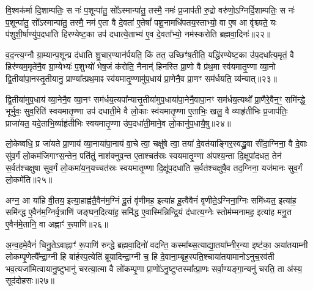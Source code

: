 {\anuvakamend[{ओष॑धयः॒ कञ्जु॑होति स्वप॒त्याया॒ष्टाद॑श च॥४॥}]}

वि॒श्वक॑र्मा दि॒शाम्पतिः॒ स नः॑ प॒शून्पा॑तु॒ सो᳚\-ऽस्मान्पा॑तु॒ तस्मै॒ नमः॑ प्र॒जाप॑ती रु॒द्रो वरु॑णो॒\-ऽग्निर्दि॒शाम्पतिः॒ स नः॑ प॒शून्पा॑तु॒ सो᳚\-ऽस्मान्पा॑तु॒ तस्मै॒ नम॑ ए॒ता वै दे॒वता॑ ए॒तेषां᳚ पशू॒नामधि॑पतय॒स्ताभ्यो॒ वा ए॒ष आ वृ॑श्च्यते॒ यः प॑शुशी॒र्\mbox{}षाण्यु॑प॒दधा॑ति हिरण्येष्ट॒का उप॑ दधात्ये॒ताभ्य॑ ए॒व दे॒वता᳚भ्यो॒ नम॑स्करोति ब्रह्मवा॒दिनः॑॥२२॥

व॒द॒न्त्य॒ग्नौ ग्रा॒म्यान्प॒शून्प्र द॑धाति शु॒चार॒ण्यान॑र्पयति॒ किं तत॒ उच्छिꣳ॑ष॒तीति॒ यद्धि॑रण्येष्ट॒का उ॑प॒दधा᳚त्य॒मृतं॒ वै हिर॑ण्यम॒मृते॑नै॒व ग्रा॒म्येभ्यः॑ प॒शुभ्यो॑ भेष॒जं क॑रोति॒ नैनान्॑ हिनस्ति प्रा॒णो वै प्र॑थ॒मा स्व॑यमातृ॒ण्णा व्या॒नो द्वि॒तीया॑पा॒नस्तृ॒तीयानु॒ प्राण्या᳚त्प्रथ॒माꣴ स्व॑यमातृ॒ण्णामु॑प॒धाय॑ प्रा॒णेनै॒व प्रा॒णꣳ सम॑र्धयति॒ व्य॑न्यात्॥२३॥

द्वि॒तीया॑मुप॒धाय॑ व्या॒नेनै॒व व्या॒नꣳ सम॑र्धय॒त्यपा᳚न्यात्तृ॒तीया॑मुप॒धाया॑पा॒नेनै॒वापा॒नꣳ सम॑र्धय॒त्यथो᳚ प्रा॒णैरे॒वैन॒ꣳ॒ समि॑न्द्धे॒ भूर्भुवः॒ सुव॒रिति॑ स्वयमातृ॒ण्णा उप॑ दधाती॒मे वै लो॒काः स्व॑यमातृ॒ण्णा ए॒ताभिः॒ खलु॒ वै व्याहृ॑तीभिः प्र॒जाप॑तिः॒ प्राजा॑यत॒ यदे॒ताभि॒र्व्याहृ॑तीभिः स्वयमातृ॒ण्णा उ॑प॒दधा॑ती॒माने॒व लो॒कानु॑प॒धायै॒षु॥२४॥

लो॒केष्वधि॒ प्र जा॑यते प्रा॒णाय॑ व्या॒नाया॑पा॒नाय॑ वा॒चे त्वा॒ चक्षु॑षे त्वा॒ तया॑ दे॒वत॑याङ्गिर॒स्वद्ध्रु॒वा सी॑दा॒ग्निना॒ वै दे॒वाः सु॑व॒र्गं लो॒कम॑जिगाꣳस॒न्तेन॒ पति॑तुं॒ नाश॑क्नुव॒न्त ए॒ताश्चत॑स्रः स्वयमातृ॒ण्णा अ॑पश्य॒न्ता दि॒क्षूपा॑दधत॒ तेन॑ स॒र्वत॑श्चक्षुषा सुव॒र्गं लो॒कमा॑य॒न्॒यच्चत॑स्रः स्वयमातृ॒ण्णा दि॒क्षू॑प॒दधा॑ति स॒र्वत॑श्चक्षुषै॒व तद॒ग्निना॒ यज॑मानः सुव॒र्गं लो॒कमे॑ति॥२५॥

{\anuvakamend[{ब्र॒ह्म॒वा॒दिनो॒ व्य॑न्यादे॒षु यज॑मान॒स्त्रीणि॑ च॥५॥}]}

अग्न॒ आ या॑हि वी॒तय॒ इत्या॒हाह्व॑तै॒वैन॑म॒ग्निं दू॒तं वृ॑णीमह॒ इत्या॑ह हू॒त्वैवैनं॑ वृणीते॒\-ऽग्निना॒ग्निः समि॑ध्यत॒ इत्या॑ह॒ समि॑न्द्ध ए॒वैन॑म॒ग्निर्वृ॒त्राणि॑ जङ्घन॒दित्या॑ह॒ समि॑द्ध ए॒वास्मि॑न्निन्द्रि॒यं द॑धात्य॒ग्नेः स्तोम॑म्मनामह॒ इत्या॑ह मनु॒त ए॒वैन॑मे॒तानि॒ वा अह्नाꣳ॑ रू॒पाणि॑॥२६॥

अ॒न्व॒हमे॒वैनं॑ चिनु॒ते\-ऽवाह्नाꣳ॑ रू॒पाणि॑ रुन्द्धे ब्रह्मवा॒दिनो॑ वदन्ति॒ कस्मा᳚थ्स॒त्याद्या॒तया᳚म्नीर॒न्या इष्ट॑का॒ अया॑तयाम्नी लोकम्पृ॒णेत्यै᳚न्द्रा॒ग्नी हि बा॑र्\mbox{}हस्प॒त्येति॑ ब्रूयादिन्द्रा॒ग्नी च॒ हि दे॒वाना॒म्बृह॒स्पति॒श्चाया॑तयामानो\-ऽनुच॒रव॑ती भव॒त्यजा॑मित्वायानु॒ष्टुभानु॑ चरत्या॒त्मा वै लो॑कम्पृ॒णा प्रा॒णो॑\-ऽनु॒ष्टुप्तस्मा᳚त्प्रा॒णः सर्वा॒ण्यङ्गा॒न्यनु॑ चरति॒ ता अ॑स्य॒ सूद॑दोहसः॥२७॥

